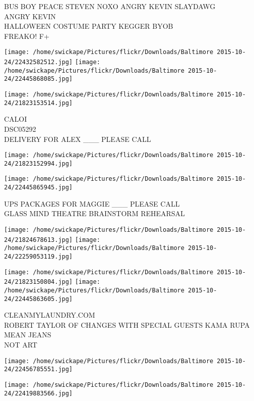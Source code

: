 \documentclass[10pt,letterpaper]{article}
\begin{document}
BUS BOY PEACE STEVEN NOXO ANGRY KEVIN SLAYDAWG\\
ANGRY KEVIN\\
HALLOWEEN COSTUME PARTY KEGGER BYOB\\
FREAKO!  F+
\pagebreak

\texttt{[image: /home/swickape/Pictures/flickr/Downloads/Baltimore 2015-10-24/22432582512.jpg]}
\texttt{[image: /home/swickape/Pictures/flickr/Downloads/Baltimore 2015-10-24/22445868085.jpg]}

\vspace{0.25in}
\texttt{[image: /home/swickape/Pictures/flickr/Downloads/Baltimore 2015-10-24/21823153514.jpg]}

CALOI\\
DSC05292\\
DELIVERY FOR ALEX \_\_\_ PLEASE CALL
\pagebreak

\texttt{[image: /home/swickape/Pictures/flickr/Downloads/Baltimore 2015-10-24/21823152994.jpg]}

\vspace{0.25in}
\texttt{[image: /home/swickape/Pictures/flickr/Downloads/Baltimore 2015-10-24/22445865945.jpg]}

UPS PACKAGES FOR MAGGIE \_\_\_ PLEASE CALL\\
GLASS MIND THEATRE BRAINSTORM REHEARSAL
\pagebreak

\texttt{[image: /home/swickape/Pictures/flickr/Downloads/Baltimore 2015-10-24/21824678613.jpg]}
\texttt{[image: /home/swickape/Pictures/flickr/Downloads/Baltimore 2015-10-24/22259053119.jpg]}

\texttt{[image: /home/swickape/Pictures/flickr/Downloads/Baltimore 2015-10-24/21823150804.jpg]}
\texttt{[image: /home/swickape/Pictures/flickr/Downloads/Baltimore 2015-10-24/22445863605.jpg]}

CLEANMYLAUNDRY.COM\\
ROBERT TAYLOR OF CHANGES WITH SPECIAL GUESTS KAMA RUPA\\
MEAN JEANS\\
NOT ART
\pagebreak

\texttt{[image: /home/swickape/Pictures/flickr/Downloads/Baltimore 2015-10-24/22456785551.jpg]}

\vspace{0.25in}
\texttt{[image: /home/swickape/Pictures/flickr/Downloads/Baltimore 2015-10-24/22419883566.jpg]}
\end{document}
